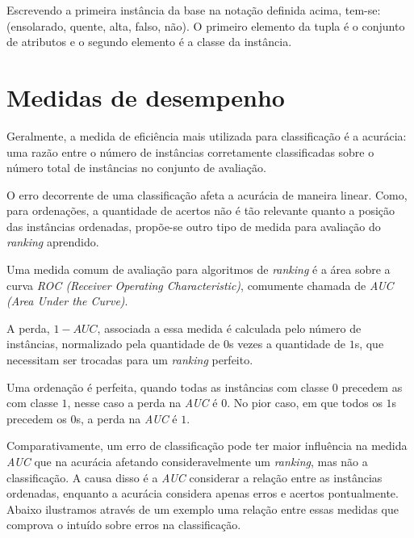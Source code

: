 Escrevendo a primeira instância da base na notação definida acima, tem-se: ({ensolarado, quente, alta, falso}, não). O primeiro elemento da tupla é o conjunto de atributos e o segundo elemento é a classe da instância.

\section{Medidas de desempenho}

Geralmente, a medida de eficiência mais utilizada para classificação é a acurácia: uma razão entre o número de instâncias corretamente classificadas sobre o número total de instâncias no conjunto de avaliação.

O erro decorrente de uma classificação afeta a acurácia de maneira linear. Como, para ordenações, a quantidade de acertos não é tão relevante quanto a posição das instâncias ordenadas, propõe-se outro tipo de medida para avaliação do \emph{ranking} aprendido.

Uma medida comum de avaliação para algoritmos de \emph{ranking} é a área sobre a curva \emph{ROC (Receiver Operating Characteristic)}, comumente chamada de \emph{AUC (Area Under the Curve)}.

A perda, $1 - AUC$, associada a essa medida é calculada pelo número de instâncias, normalizado pela quantidade de $0$s vezes a quantidade de $1$s, que necessitam ser trocadas para um \emph{ranking} perfeito.

Uma ordenação é perfeita, quando todas as instâncias com classe $0$ precedem as com classe $1$, nesse caso a perda na \emph{AUC} é $0$. No pior caso, em que todos os $1$s precedem os $0$s, a perda na \emph{AUC} é $1$.

Comparativamente, um erro de classificação pode ter maior influência na medida \emph{AUC} que na acurácia afetando consideravelmente um \emph{ranking}, mas não a classificação. A causa disso é a \emph{AUC} considerar a relação entre as instâncias ordenadas, enquanto a acurácia considera apenas erros e acertos pontualmente. Abaixo ilustramos através de um exemplo uma relação entre essas medidas que comprova o intuído sobre erros na classificação.

